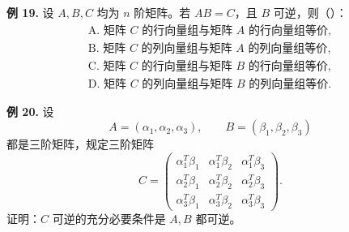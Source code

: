 \begin{problemblock}
\textbf{例 19.} 设 \(A,B,C\) 均为 \(n\) 阶矩阵。若 \(AB=C\)，且 \(B\) 可逆，则（\quad）：
\[
\begin{array}{l}
\text{A. 矩阵 }C\text{ 的行向量组与矩阵 }A\text{ 的行向量组等价},\\
\text{B. 矩阵 }C\text{ 的列向量组与矩阵 }A\text{ 的列向量组等价},\\
\text{C. 矩阵 }C\text{ 的行向量组与矩阵 }B\text{ 的行向量组等价},\\
\text{D. 矩阵 }C\text{ 的列向量组与矩阵 }B\text{ 的列向量组等价}.
\end{array}
\]
\end{problemblock}
\begin{solutionblock}
\end{solutionblock}

\begin{problemblock}
\textbf{例 20.} 设
\[
A=(\alpha_1,\alpha_2,\alpha_3),\qquad B=(\beta_1,\beta_2,\beta_3)
\]
都是三阶矩阵，规定三阶矩阵
\[
C=\begin{pmatrix}
\alpha_1^T\beta_1&\alpha_1^T\beta_2&\alpha_1^T\beta_3\\
\alpha_2^T\beta_1&\alpha_2^T\beta_2&\alpha_2^T\beta_3\\
\alpha_3^T\beta_1&\alpha_3^T\beta_2&\alpha_3^T\beta_3
\end{pmatrix}.
\]
证明：\(C\) 可逆的充分必要条件是 \(A,B\) 都可逆。
\end{problemblock}
\begin{solutionblock}
\end{solutionblock}

